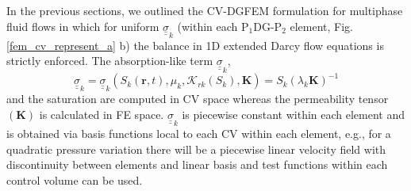 \documentclass[preprint,authoryear,12pt]{elsarticle}
\begin{document}
{In the previous sections, we outlined the CV-DGFEM formulation for
multiphase fluid flows in which for uniform ${\underline{\underline
    \sigma}}_{k}$ (within each P$_{1}$DG-P$_{2}$ element,
Fig. \ref{fem_cv_represent_a} b) the balance in 1D extended Darcy flow
equations is strictly enforced. The absorption-like term
${\underline{\underline \sigma}}_{k}$,
\begin{displaymath}
{\underline {\underline \sigma}}_{k} = {\underline {\underline
    \sigma}}_{k}
\left(S_{k}\left(\mathbf{r},t\right),\mu_{k},\mathcal{K}_{rk}\left(S_{k}\right),\mathbf{K}\right)
= S_{k}\left(\lambda_{k}\mathbf{K}\right)^{-1}
\end{displaymath}
and the saturation are computed in CV space whereas the permeability
tensor $\left(\mathbf{K}\right)$ is calculated in FE
space. ${\underline {\underline \sigma}}_{k}$ is piecewise constant
within each element and is obtained via basis functions local to each
CV within each element, e.g., for a quadratic pressure variation there
will be a piecewise linear velocity field with discontinuity between
elements and linear basis and test functions within each control
volume can be used.

}
\end{document}
